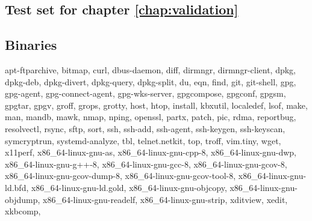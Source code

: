 \documentclass[
    12pt,                               %
    DIV=14,                     %
    parskip=half+,              %
    bigheadings,                %
    cleardoubleempty,   %
    halfparskip,                %
    ]{scrreprt} %
\begin{document}
\begin{appendices}
\chapter{Test set for chapter \ref{chap:validation}} \label{appendix:testset}
\section{Binaries}
\begin{sloppypar}
{\scriptsize
apt-ftparchive, bitmap, curl, dbus-daemon, diff, dirmngr, dirmngr-client, dpkg, dpkg-deb, dpkg-divert, dpkg-query, dpkg-split, du, eqn, find, git, git-shell, gpg, gpg-agent, gpg-connect-agent, gpg-wks-server, gpgcompose, gpgconf, gpgsm, gpgtar, gpgv, groff, grops, grotty, host, htop, install, kbxutil, localedef, lsof, make, man, mandb, mawk, nmap, nping, openssl, partx, patch, pic, rdma, reportbug, resolvectl, rsync, sftp, sort, ssh, ssh-add, ssh-agent, ssh-keygen, ssh-keyscan, symcryptrun, systemd-analyze, tbl, telnet.netkit, top, troff, vim.tiny, wget, x11perf, x86\_64-linux-gnu-as, x86\_64-linux-gnu-cpp-8, x86\_64-linux-gnu-dwp, x86\_64-linux-gnu-g++-8, x86\_64-linux-gnu-gcc-8, x86\_64-linux-gnu-gcov-8, x86\_64-linux-gnu-gcov-dump-8, x86\_64-linux-gnu-gcov-tool-8, x86\_64-linux-gnu-ld.bfd, x86\_64-linux-gnu-ld.gold, x86\_64-linux-gnu-objcopy, x86\_64-linux-gnu-objdump, x86\_64-linux-gnu-readelf, x86\_64-linux-gnu-strip, xditview, xedit, xkbcomp,
}
\end{sloppypar}


\end{appendices}
\end{document}
